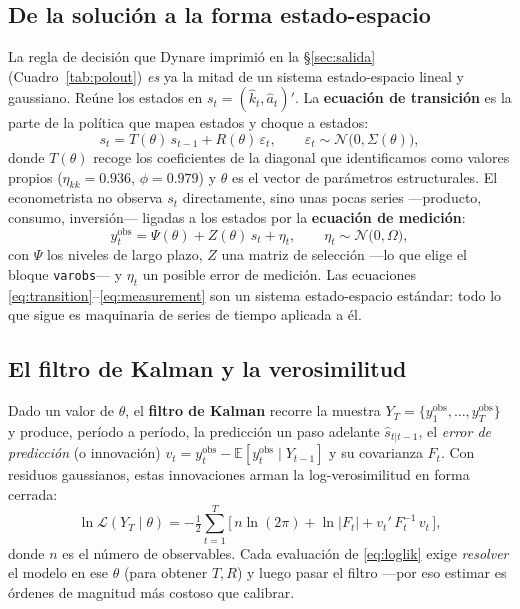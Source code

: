 \documentclass[11pt,a4paper]{report}
\newcommand{\code}[1]{\texttt{#1}}
\newcommand{\E}{\mathbb{E}}
\begin{document}
\subsection{De la solución a la forma estado-espacio}

La regla de decisión que Dynare imprimió en la \S\ref{sec:salida} (Cuadro~\ref{tab:polout})
\emph{es} ya la mitad de un sistema estado-espacio lineal y gaussiano. Reúne los
estados en $s_t=(\hat k_t,\hat a_t)'$. La \textbf{ecuación de transición} es la parte
de la política que mapea estados y choque a estados:
\begin{equation}
s_t = T(\theta)\,s_{t-1} + R(\theta)\,\varepsilon_t,
\qquad \varepsilon_t\sim\mathcal{N}\!\big(0,\Sigma(\theta)\big),
\label{eq:transition}
\end{equation}
donde $T(\theta)$ recoge los coeficientes de la diagonal que identificamos como
valores propios ($\eta_{kk}=0.936$, $\phi=0.979$) y $\theta$ es el vector de
parámetros estructurales. El econometrista no observa $s_t$ directamente, sino unas
pocas series ---producto, consumo, inversión--- ligadas a los estados por la
\textbf{ecuación de medición}:
\begin{equation}
y^{\text{obs}}_t = \Psi(\theta) + Z(\theta)\,s_t + \eta_t,
\qquad \eta_t\sim\mathcal{N}\!\big(0,\Omega\big),
\label{eq:measurement}
\end{equation}
con $\Psi$ los niveles de largo plazo, $Z$ una matriz de selección ---lo que elige
el bloque \code{varobs}--- y $\eta_t$ un posible error de medición. Las ecuaciones
\eqref{eq:transition}--\eqref{eq:measurement} son un sistema estado-espacio estándar:
todo lo que sigue es maquinaria de series de tiempo aplicada a él.

\subsection{El filtro de Kalman y la verosimilitud}

Dado un valor de $\theta$, el \textbf{filtro de Kalman} recorre la muestra
$Y_T=\{y^{\text{obs}}_1,\dots,y^{\text{obs}}_T\}$ y produce, período a período, la
predicción un paso adelante $\hat s_{t|t-1}$, el \emph{error de predicción} (o
innovación) $v_t = y^{\text{obs}}_t - \E[y^{\text{obs}}_t\mid Y_{t-1}]$ y su
covarianza $F_t$. Con residuos gaussianos, estas innovaciones arman la
log-verosimilitud en forma cerrada:
\begin{equation}
\ln \mathcal{L}(Y_T\mid\theta) = -\tfrac12\sum_{t=1}^{T}
\Big[\, n\ln(2\pi) + \ln\lvert F_t\rvert + v_t'\,F_t^{-1}\,v_t \,\Big],
\label{eq:loglik}
\end{equation}
donde $n$ es el número de observables. Cada evaluación de \eqref{eq:loglik} exige
\emph{resolver} el modelo en ese $\theta$ (para obtener $T,R$) y luego pasar el
filtro ---por eso estimar es órdenes de magnitud más costoso que calibrar.
\end{document}
